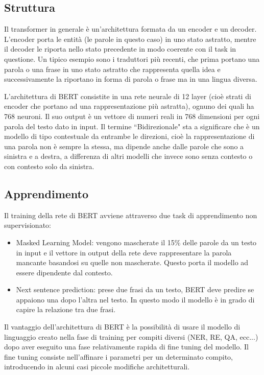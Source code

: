 \documentclass[12pt]{report}
\newcommand{\quotes}[1]{``#1"}
\begin{document}
\subsection{Struttura}

Il transformer in generale è un'architettura formata da un encoder e un decoder. L'encoder porta le entità (le parole in questo caso) in uno stato astratto, mentre il decoder le riporta nello stato precedente in modo coerente con il task in questione. Un tipico esempio sono i traduttori più recenti, che prima portano una parola o una frase in uno stato astratto che rappresenta quella idea e successivamente la riportano in forma di parola o frase ma in una lingua diversa.

L'architettura di BERT consistite in una rete neurale di 12 layer (cioè strati di encoder che portano ad una rappresentazione più astratta), ognuno dei quali ha 768 neuroni. Il suo output è un vettore di numeri reali in 768 dimensioni per ogni parola del testo dato in input. Il termine \quotes{Bidirezionale} sta a significare che è un modello di tipo contestuale da entrambe le direzioni, cioè la rappresentazione di una parola non è sempre la stessa, ma dipende anche dalle parole che sono a sinistra e a destra, a differenza di altri modelli che invece sono senza contesto o con contesto solo da sinistra.

\subsection{Apprendimento}

Il training della rete di BERT avviene attraverso due task di apprendimento non supervisionato:
\begin{itemize}
    \item Masked Learning Model: vengono mascherate il 15\% delle parole da un testo in input e il vettore in output della rete deve rappresentare la parola mancante basandosi su quelle non mascherate. Questo porta il modello ad essere dipendente dal contesto.
    \item Next sentence prediction: prese due frasi da un testo, BERT deve predire se appaiono una dopo l'altra nel testo. In questo modo il modello è in grado di capire la relazione tra due frasi.
\end{itemize}

Il vantaggio dell'architettura di BERT è la possibilità di usare il modello di linguaggio creato nella fase di training per compiti diversi (NER, RE, QA, ecc...) dopo aver eseguito una fase relativamente rapida di fine tuning del modello. Il fine tuning consiste nell'affinare i parametri per un determinato compito, introducendo in alcuni casi piccole modifiche architetturali.
\end{document}
